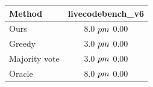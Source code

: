 \begin{tabular}{lc}
\toprule
Method & livecodebench_v6 \\
\midrule
Ours & 8.0 $\\pm$ 0.00 \\
Greedy & 3.0 $\\pm$ 0.00 \\
Majority vote & 3.0 $\\pm$ 0.00 \\
Oracle & 8.0 $\\pm$ 0.00 \\
\bottomrule
\end{tabular}
